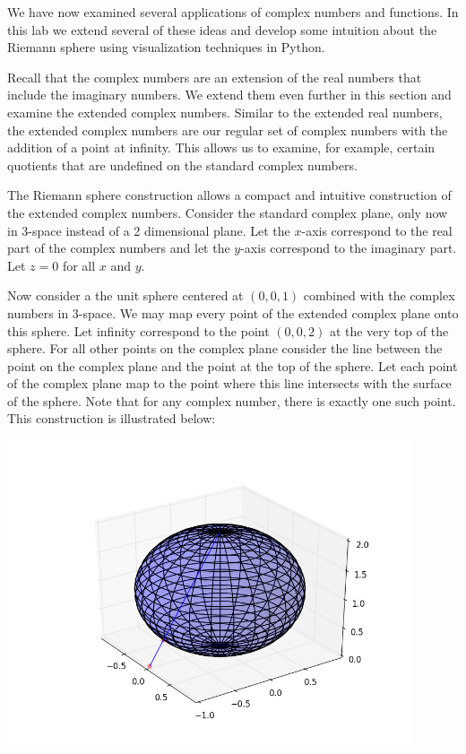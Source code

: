 

We have now examined several applications of complex numbers and functions.  In this lab we extend several of these ideas and develop some intuition about the Riemann sphere using visualization techniques in Python.

Recall that the complex numbers are an extension of the real numbers that include the imaginary numbers.  We extend them even further in this section and examine the extended complex numbers.  Similar to the extended real numbers, the extended complex numbers are our regular set of complex numbers with the addition of a point at infinity.  This allows us to examine, for example, certain quotients that are undefined on the standard complex numbers.

The Riemann sphere construction allows a compact and intuitive construction of the extended complex numbers.  Consider the standard complex plane, only now in 3-space instead of a 2 dimensional plane. Let the $x$-axis correspond to the real part of the complex numbers and let the $y$-axis correspond to the imaginary part.  Let $z=0$ for all $x$ and $y$. 

Now consider a the unit sphere centered at $(0,0,1)$ combined with the complex numbers in 3-space. We may map every point of the extended complex plane onto this sphere. Let infinity correspond to the point $(0,0,2)$ at the very top of the sphere. For all other points on the complex plane consider the line between the point on the complex plane and the point at the top of the sphere. Let each point of the complex plane map to the point where this line intersects with the surface of the sphere. Note that for any complex number, there is exactly one such point. This construction is illustrated below:

\includegraphics[width=120mm]{StereographicIllustration.png}

